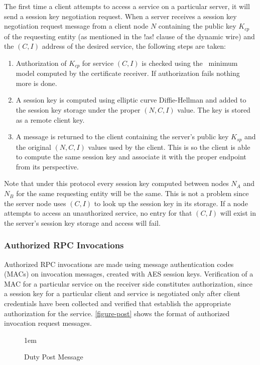 The first time a client attempts to access a service on a particular server, it will send a
session key negotiation request. When a server receives a session key negotiation request
message from a client node $N$ containing the public key $K_{cp}$ of the requesting entity (as
mentioned in the !as! clause of the dynamic wire) and the $(C, I)$ address of the desired
service, the following steps are taken:

\begin{enumerate}
\item Authorization of $K_{cp}$ for service $(C, I)$ is checked using the \RT\ minimum model
  computed by the certificate receiver. If authorization fails nothing more is done.
\item A session key is computed using elliptic curve Diffie-Hellman and added to the session key
  storage under the proper $(N, C, I)$ value. The key is stored as a remote client key.
\item A message is returned to the client containing the server's public key $K_{sp}$ and the
  original $(N, C, I)$ values used by the client. This is so the client is able to compute the
  same session key and associate it with the proper endpoint from its perspective.
\end{enumerate}

Note that under this protocol every session key computed between nodes $N_A$ and $N_B$ for the
same requesting entity will be the same. This is not a problem since the server node uses $(C,
I)$ to look up the session key in its storage. If a node attempts to access an unauthorized
service, no entry for that $(C, I)$ will exist in the server's session key storage and access
will fail.

\subsubsection{Authorized RPC Invocations}

Authorized RPC invocations are made using message authentication codes (MACs) on invocation
messages, created with AES session keys. Verification of a MAC for a particular service on the
receiver side constitutes authorization, since a session key for a particular client and service
is negotiated only after client credentials have been collected and verified that establish the
appropriate authorization for the service. \autoref{figure-post} shows the format of authorized
invocation request messages.

\begin{figure}[t]
  
  \centerline{\raise 1em\box\graph}
  \caption{Duty Post Message}
  \label{figure-post}
\end{figure}

